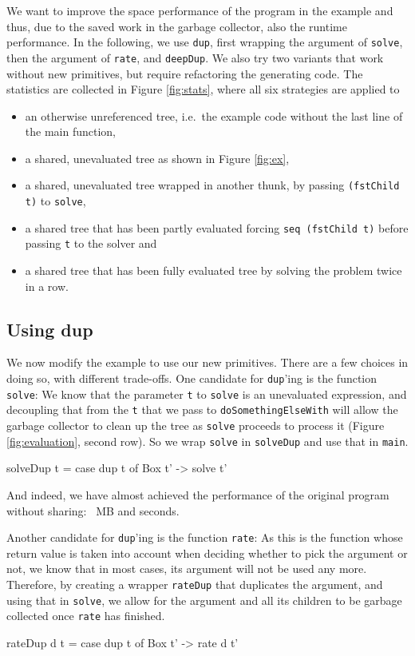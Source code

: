 \documentclass[preprint]{sigplanconf}
\theoremstyle{nonumberplain}
\newcommand{\li}{\lstinline[style=Haskell]}
\begin{document}
We want to improve the space performance of the program in the example and thus, due to the saved work in the garbage collector, also the runtime performance. In the following, we use \li-dup-, first wrapping the argument of \li-solve-, then the argument of \li-rate-, and \li-deepDup-. We also try two variants that work without new primitives, but require refactoring the generating code. The statistics are collected in Figure \ref{fig:stats}, where all six strategies are applied to
\begin{itemize}
\item an otherwise unreferenced tree, i.e.\ the example code without the last line of the main function,
\item a shared, unevaluated tree as shown in Figure \ref{fig:ex},
\item a shared, unevaluated tree wrapped in another thunk, by passing \li-(fstChild t)- to \li-solve-,
\item a shared tree that has been partly evaluated forcing \li-seq (fstChild t)- before passing \li-t- to the solver and
\item a shared tree that has been fully evaluated tree by solving the problem twice in a row.
\end{itemize}

\subsection{Using dup}

We now modify the example to use our new primitives. There are a few choices in doing so, with different trade-offs. One candidate for \li-dup-’ing is the function \li-solve-: We know that the parameter \li-t- to \li-solve- is an unevaluated expression, and decoupling that from the \li-t- that we pass to \li-doSomethingElseWith- will allow the garbage collector to clean up the tree as \li-solve- proceeds to process it (Figure \ref{fig:evaluation}, second row). So we wrap \li-solve- in \li-solveDup- and use that in \li-main-.
\begin{haskell}
solveDup t = case dup t of Box t' -> solve t'
\end{haskell}
And indeed, we have almost achieved the performance of the original program without sharing: ~MB and  seconds.


Another candidate for \li-dup-’ing is the function \li-rate-:
As this is the function whose return value is taken into account when deciding whether to pick the argument or not, we know that in most cases, its argument will not be used any more. Therefore, by creating a wrapper \li-rateDup- that duplicates the argument, and using that in \li-solve-, we allow for the argument and all its children to be garbage collected once \li-rate- has finished.
\begin{haskell}
rateDup d t = case dup t of Box t' -> rate d t'
\end{haskell}
\end{document}
